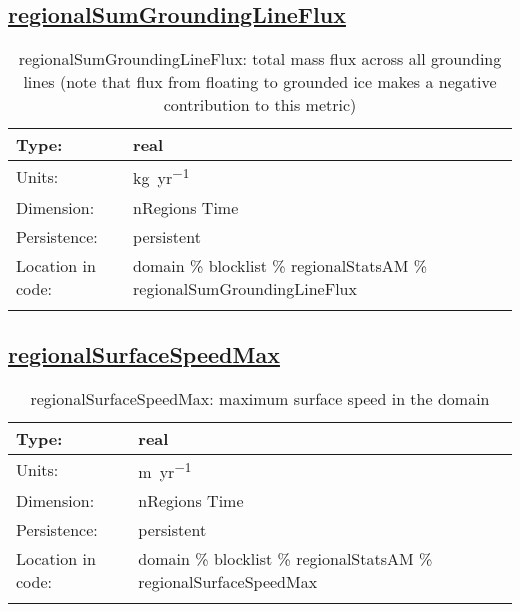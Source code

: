 \subsection[regionalSumGroundingLineFlux]{\hyperref[sec:var_tab_regionalStatsAM]{regionalSumGroundingLineFlux}}
\label{subsec:var_sec_regionalStatsAM_regionalSumGroundingLineFlux}
\begin{center}
\begin{longtable}{| p{2.0in} | p{4.0in} |}
        \hline 
        Type: & real \\
        \hline 
        Units: & \si{kg.yr^{-1}} \\
        \hline 
        Dimension: & nRegions Time \\
        \hline 
        Persistence: & persistent \\
        \hline 
         Location in code: & domain \% blocklist \% regionalStatsAM \% regionalSumGroundingLineFlux \\
         \hline 
    \caption{regionalSumGroundingLineFlux: total mass flux across all grounding lines (note that flux from floating to grounded ice makes a negative contribution to this metric)}
\end{longtable}
\end{center}
\subsection[regionalSurfaceSpeedMax]{\hyperref[sec:var_tab_regionalStatsAM]{regionalSurfaceSpeedMax}}
\label{subsec:var_sec_regionalStatsAM_regionalSurfaceSpeedMax}
\begin{center}
\begin{longtable}{| p{2.0in} | p{4.0in} |}
        \hline 
        Type: & real \\
        \hline 
        Units: & \si{m.yr^{-1}} \\
        \hline 
        Dimension: & nRegions Time \\
        \hline 
        Persistence: & persistent \\
        \hline 
         Location in code: & domain \% blocklist \% regionalStatsAM \% regionalSurfaceSpeedMax \\
         \hline 
    \caption{regionalSurfaceSpeedMax: maximum surface speed in the domain}
\end{longtable}
\end{center}
